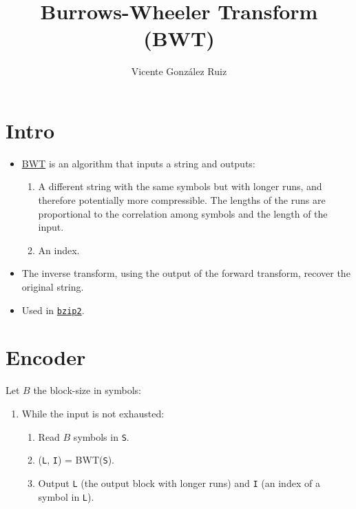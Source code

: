 
\title{Burrows-Wheeler Transform (BWT)}

\author{Vicente González Ruiz}

\maketitle

\section{Intro}
\begin{itemize}
\item \href{https://scholar.google.es/scholar?hl=es\&as_sdt=0\%2C5\&q=Burrows+M\%2C+Wheeler+DJ\%3A+A+Block+Sorting+Lossless+Data+Compression+Algorithm.\&btnG=}{BWT} is an algorithm that inputs a string and outputs:

  \begin{enumerate}
  \tightlist
  \item
    A different string with the same symbols but with longer runs, and
    therefore potentially more compressible. The lengths of the runs
    are proportional to the correlation among symbols and the length
    of the input.
  \item
    An index.
  \end{enumerate}
\item
  The inverse transform, using the output of the forward transform,
  recover the original string.
\item
  Used in \href{https://en.wikipedia.org/wiki/Bzip2}{\texttt{bzip2}}.
\end{itemize}

\section{Encoder}\label{encoder}

Let \(B\) the block-size in symbols:

\begin{enumerate}
\tightlist
\item
  While the input is not exhausted:
  \begin{enumerate}
  \tightlist
  \item
    Read \(B\) symbols in \texttt{S}.
  \item
    (\texttt{L}, \texttt{I}) = BWT(\texttt{S}).
  \item
    Output \texttt{L} (the output block with longer runs) and \texttt{I}
    (an index of a symbol in \texttt{L}).
  \end{enumerate}
\end{enumerate}

